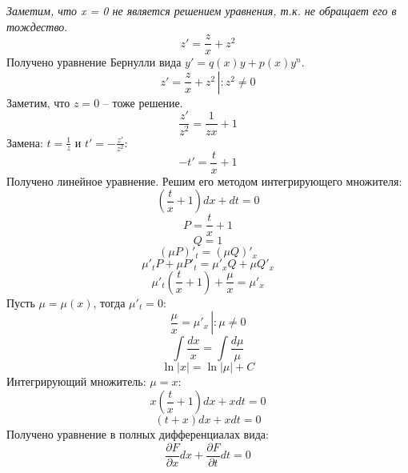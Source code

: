 \documentclass[a5paper, 10pt]{article}
\theoremstyle{definition}
\theoremstyle{plain}
\theoremstyle{remark}
\begin{document}
\textit{Заметим, что x = 0 не является решением уравнения, т.к. не обращает его в тождество}.
\begin{equation*}
z'  =  \frac{z}{x} + z^2 
\end{equation*} 
Получено уравнение Бернулли вида $y' = q(x)y + p(x) y^n$.
\begin{equation*}
z'  =  \frac{z}{x} + z^2  \, \left| \right. :  z^2 \neq 0 
\end{equation*} 
Заметим, что $z = 0$ -- тоже решение.
\begin{equation*}
 \frac{z'}{ z^2}  =  \frac{1}{zx} + 1 
\end{equation*} 
Замена: $t = \frac{1}{z}$ и $t' = - \frac{z'}{z^2}$:
\begin{equation*}
-t'  =  \frac{t}{x} + 1 
\end{equation*} 
Получено линейное уравнение. Решим его методом интегрирующего множителя:
\begin{equation*}
\left(   \frac{t}{x} + 1  \right) dx + dt = 0
\end{equation*}
\begin{equation*}
P =  \frac{t}{x} + 1
\end{equation*}
\begin{equation*}
Q = 1
\end{equation*}
\begin{equation*}
\left( \mu P \right)'_t = \left( \mu Q \right)'_x
\end{equation*}
\begin{equation*}
 \mu'_t P + \mu P'_t = \mu'_x Q  +  \mu Q'_x
\end{equation*}
\begin{equation*}
 \mu'_t  \left(   \frac{t}{x} + 1  \right) +  \frac{\mu}{x} = \mu'_x 
\end{equation*}
Пусть $\mu = \mu(x)$, тогда $\mu'_t = 0$:
\begin{equation*}
 \frac{\mu}{x} = \mu'_x  \, \left| \right. :  \mu \neq 0 
\end{equation*}
\begin{equation*}
 \int \frac{dx}{ x}  = \int \frac{d\mu}{\mu} 
\end{equation*} 
\begin{equation*}
 \ln |x|  = \ln |\mu| + C 
\end{equation*} 
Интегрирующий множитель: $\mu = x$:
\begin{equation*}
x \left(   \frac{t}{x} + 1  \right) dx + x dt = 0
\end{equation*}
\begin{equation*}
\left(  t + x \right) dx + x dt = 0
\end{equation*}
Получено уравнение в полных дифференциалах вида:
\begin{equation*}
\frac{\partial F}{\partial x}dx + \frac{\partial F}{\partial t}dt = 0
\end{equation*}
\end{document}
